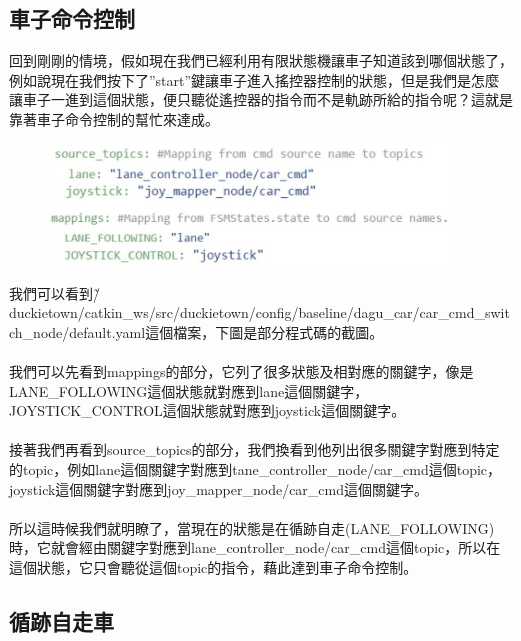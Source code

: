 \documentclass{article}
\begin{document}
\subsection{車子命令控制}

回到剛剛的情境，假如現在我們已經利用有限狀態機讓車子知道該到哪個狀態了，例如說現在我們按下了”start”鍵讓車子進入搖控器控制的狀態，但是我們是怎麼讓車子一進到這個狀態，便只聽從遙控器的指令而不是軌跡所給的指令呢？這就是靠著車子命令控制的幫忙來達成。
\begin{figure}[htp]
    \begin{center}
        \includegraphics[width=300pt]{pic/圖片28.jpg}
    \end{center}
\end{figure}
我們可以看到\~/duckietown/catkin\_ws/src/duckietown/config/baseline/dagu\_car/car\_cmd\_switch\_node/default.yaml這個檔案，下圖是部分程式碼的截圖。
\\
\\我們可以先看到mappings的部分，它列了很多狀態及相對應的關鍵字，像是LANE\_FOLLOWING這個狀態就對應到lane這個關鍵字，JOYSTICK\_CONTROL這個狀態就對應到joystick這個關鍵字。
\\
\\接著我們再看到source\_topics的部分，我們換看到他列出很多關鍵字對應到特定的topic，例如lane這個關鍵字對應到tane\_controller\_node/car\_cmd這個topic，joystick這個關鍵字對應到joy\_mapper\_node/car\_cmd這個關鍵字。
\\
\\所以這時候我們就明瞭了，當現在的狀態是在循跡自走(LANE\_FOLLOWING)時，它就會經由關鍵字對應到lane\_controller\_node/car\_cmd這個topic，所以在這個狀態，它只會聽從這個topic的指令，藉此達到車子命令控制。
\\

\subsection{循跡自走車}
\end{document}
